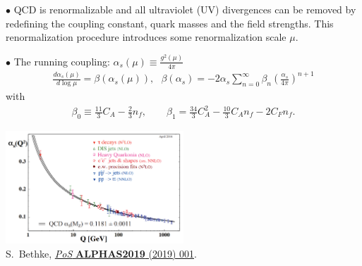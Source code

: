 \documentclass[9pt,a4paper,unknownkeysallowed,xcolor=dvipsnames,aspectratio=43]{beamer}
\begin{document}
\begin{frame}\vspace{2mm}

{\color{darkred}\Large$\bullet$} QCD is renormalizable and all ultraviolet (UV) divergences can be removed by redefining the coupling constant, quark masses and the field strengths. This renormalization procedure introduces some renormalization scale $\mu$.\\
\vspace{1mm}

{\color{darkred}\Large$\bullet$} {\color{darkred} The running coupling}: $\alpha_s(\mu)\equiv \frac{g^2(\mu)}{4\pi}$\\
\begin{align}
\frac{d\alpha_s(\mu)}{d\log\mu}=\beta(\alpha_s(\mu)),~~~\beta(\alpha_s) = -2\alpha_s \sum_{n=0}^{\infty}\beta_n \left( \frac{\alpha_s}{4\pi} \right)^{n+1}
\end{align}
with
\begin{align}
\beta_0\equiv \frac{11}{3}C_A-\frac{2}{3}n_f,\qquad\beta_1=\frac{34}{3} C_A^2-\frac{10}{3}C_A n_f-2 C_F n_f.
\end{align}

\begin{center}
\includegraphics[width=0.5\textwidth]{02/alphas.png}\\
{\tiny \color{teablue}S.~Bethke,
  \href{https://doi.org/10.22323/1.365.0001}{\emph{PoS} {\bfseries ALPHAS2019}
  (2019) 001}.}\\
\end{center}
\end{frame}
%
%
\end{document}
